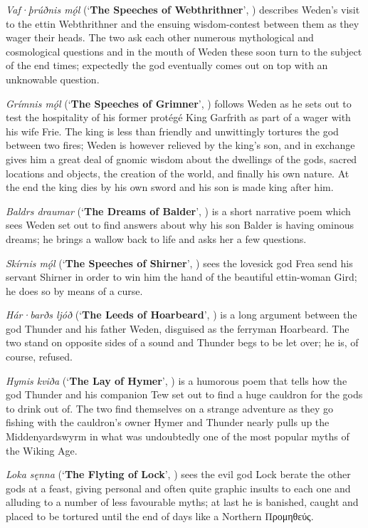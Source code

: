 \emph{Vaf·þrúðnis mǫ́l} (‘\textbf{The Speeches of Webthrithner}’, ) describes Weden’s visit to the ettin Webthrithner and the ensuing wisdom-contest between them as they wager their heads.  The two ask each other numerous mythological and cosmological questions and in the mouth of Weden these soon turn to the subject of the end times; expectedly the god eventually comes out on top with an unknowable question.

\emph{Grímnis mǫ́l} (‘\textbf{The Speeches of Grimner}’, ) follows Weden as he sets out to test the hospitality of his former protégé King Garfrith as part of a wager with his wife Frie.  The king is less than friendly and unwittingly tortures the god between two fires; Weden is however relieved by the king’s son, and in exchange gives him a great deal of gnomic wisdom about the dwellings of the gods, sacred locations and objects, the creation of the world, and finally his own nature.  At the end the king dies by his own sword and his son is made king after him.

\emph{Baldrs draumar} (‘\textbf{The Dreams of Balder}’, ) is a short narrative poem which sees Weden set out to find answers about why his son Balder is having ominous dreams; he brings a wallow back to life and asks her a few questions.

\emph{Skírnis mǫ́l} (‘\textbf{The Speeches of Shirner}’, ) sees the lovesick god Frea send his servant Shirner in order to win him the hand of the beautiful ettin-woman Gird; he does so by means of a curse.

\emph{Hár·barðs ljóð} (‘\textbf{The Leeds of Hoarbeard}’, ) is a long argument between the god Thunder and his father Weden, disguised as the ferryman Hoarbeard.  The two stand on opposite sides of a sound and Thunder begs to be let over; he is, of course, refused.

\emph{Hymis kviða} (‘\textbf{The Lay of Hymer}’, ) is a humorous poem that tells how the god Thunder and his companion Tew set out to find a huge cauldron for the gods to drink out of.  The two find themselves on a strange adventure as they go fishing with the cauldron’s owner Hymer and Thunder nearly pulls up the Middenyardswyrm in what was undoubtedly one of the most popular myths of the Wiking Age.

\emph{Loka sęnna} (‘\textbf{The Flyting of Lock}’, ) sees the evil god Lock berate the other gods at a feast, giving personal and often quite graphic insults to each one and alluding to a number of less favourable myths; at last he is banished, caught and placed to be tortured until the end of days like a Northern \textgreek{Προμηθεύς}.

